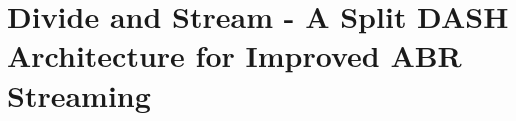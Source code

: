 \chapter[SpDASH]{Divide and Stream - A Split DASH Architecture for Improved ABR Streaming}
\label{chapter05}
\noindent

\renewcommand{\relpath}[1]{Chapters/05.SpDASH/}
\graphicspath{{Chapters/05.SpDASH/}}

\newcommand{\red}[1]{\textcolor{red}{#1}}
\newcommand{\bel}{\textit{Belovezha}}
\newcommand{\servname}{\textit{BiFrost}}
\newcommand{\cliname}{\bel\ client}
\renewcommand{\basabdatta}[1]{\textcolor{red}{\textit{\textbf{#1}}}}
\renewcommand{\jay}[1]{\textcolor{red}{{\textbf{#1}}}}
\newcommand{\krishna}[1]{\textcolor{blue}{{\textbf{#1}}}}
\newcommand{\am}[1]{\textcolor{blue}{#1}}
\newcommand{\notesc}[1]{\textcolor{red}{\textit{\textbf{#1}}}}



%






